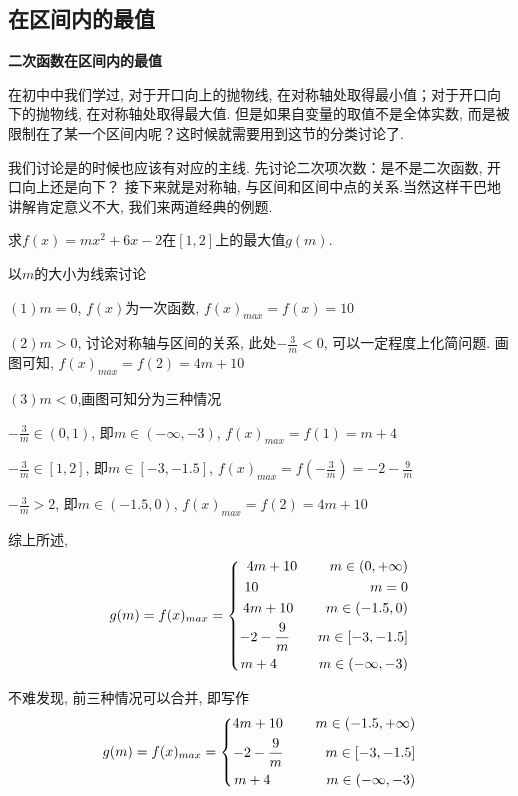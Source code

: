 \clearpage
\subsection{在区间内的最值}
\begin{know}
    \item \textbf{二次函数在区间内的最值}
\end{know}
在初中中我们学过, 对于开口向上的抛物线, 在对称轴处取得最小值；对于开口向下的抛物线, 在对称轴处取得最大值.
但是如果自变量的取值不是全体实数, 而是被限制在了某一个区间内呢？这时候就需要用到这节的分类讨论了.

我们讨论是的时候也应该有对应的主线. 先讨论二次项次数：是不是二次函数, 开口向上还是向下？
接下来就是对称轴, 与区间和区间中点的关系.当然这样干巴地讲解肯定意义不大, 我们来两道经典的例题.
\begin{example}
    求$f(x)=mx^2+6x-2$在$[1,2]$上的最大值$g(m)$.
\end{example}
\begin{analyse}
\end{analyse}
\begin{jie}以$m$的大小为线索讨论

$(1)$$m=0$, $f(x)$为一次函数, $f(x)_{max}=f(x)=10$

$(2)$$m>0$, 讨论对称轴与区间的关系, 此处$-\frac{3}{m}<0$, 可以一定程度上化简问题. 
画图可知, $f(x)_{max}=f(2)=4m+10$

$(3)$$m<0$,画图可知分为三种情况

$-\frac{3}{m} \in (0,1)$, 即$m \in (-\infty,-3)$, 
$f(x)_{max}=f(1)=m+4$

$-\frac{3}{m} \in [1,2]$, 即$m \in [-3,-1.5]$, 
$f(x)_{max}=f(-\frac{3}{m})=-2-\frac{9}{m}$

$-\frac{3}{m}>2$, 即$m \in (-1.5,0)$, 
$f(x)_{max}=f(2)=4m+10$

综上所述, 
\begin{equation}\notag
    g(m)=f(x)_{max}=\left\{
        \begin{aligned}
        4m+10    \qquad\    m \in (0,+\infty)\\
        10       \qquad\qquad\qquad\qquad   m=0\\
        4m+10    \qquad\    m \in (-1.5,0)\\
        -2-\frac{9}{m}   \qquad   m \in [-3,-1.5]\\
        m+4      \qquad\quad   m \in (-\infty,-3)\\
        \end{aligned}
        \right.
\end{equation}
    
不难发现, 前三种情况可以合并, 即写作
\begin{equation}\notag
    g(m)=f(x)_{max}=\left\{
        \begin{aligned}
        4m+10    \qquad\    m \in (-1.5,+\infty)\\
        -2-\frac{9}{m}    \quad\qquad  m \in [-3,-1.5]\\
        m+4      \qquad\qquad   m \in (-\infty,-3)\\
        \end{aligned}
        \right.
\end{equation}
\end{jie}
